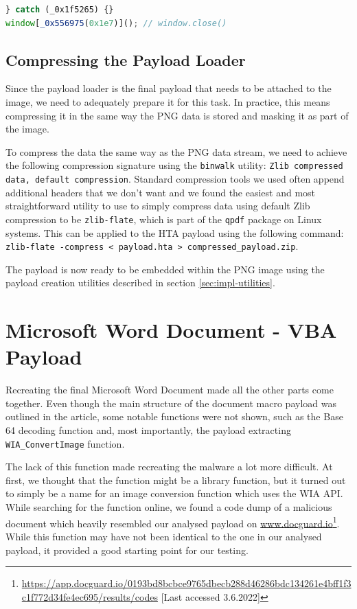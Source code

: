 \begin{lstlisting}[language=JavaScript, caption={Obfuscated payload loader.}]
} catch (_0x1f5265) {}
window[_0x556975(0x1e7)](); // window.close()
\end{lstlisting}

\subsection{Compressing the Payload Loader}
Since the payload loader is the final payload that needs to be attached to the image, we need to adequately prepare it
for this task. In practice, this means compressing it in the same way the \acrshort{PNG} data is stored and masking it
as part of the image. 

To compress the data the same way as the \acrshort{PNG} data stream, we need to achieve the following compression
signature using the \verb+binwalk+ utility: \verb+Zlib compressed data, default compression+. Standard compression tools
we used often append additional headers that we don't want and we found the easiest and most straightforward utility to
use to simply compress data using default Zlib compression to be \verb+zlib-flate+, which is part of the \verb+qpdf+
package on Linux systems. This can be applied to the \acrshort{HTA} payload using the following command: 
\verb+zlib-flate -compress < payload.hta > compressed_payload.zip+.

The payload is now ready to be embedded within the \acrshort{PNG} image using the payload creation utilities described
in section \ref{sec:impl-utilities}.


\section{Microsoft Word Document - \acrshort{VBA} Payload} \label{sec:impl-macro}
Recreating the final Microsoft Word Document made all the other parts come together. Even though the main structure of
the document macro payload was outlined in the article, some notable functions were not shown, such as the Base 64
decoding function and, most importantly, the payload extracting \verb+WIA_ConvertImage+ function.

The lack of this function made recreating the malware a lot more difficult. At first, we thought that the function might
be a library function, but it turned out to simply be a name for an image conversion function which uses the
\acrfull{WIA} \acrshort{API}. While searching for the function online, we found a code dump of a malicious document which
heavily resembled our analysed payload on \url{www.docguard.io}\footnote{\url{
https://app.docguard.io/0193bd8bcbce9765dbecb288d46286bdc134261e4bff1f3c1f772d34fe4ec695/results/codes}
[Last accessed 3.6.2022]}. While this function may have not been identical to the one in our analysed payload, it
provided a good starting point for our testing. 

